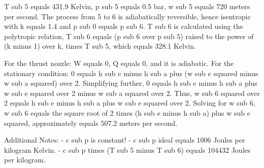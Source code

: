 T sub 5 equals 431.9 Kelvin, p sub 5 equals 0.5 bar, w sub 5 equals 720 meters per second. The process from 5 to 6 is adiabatically reversible, hence isentropic with k equals 1.4 and p sub 0 equals p sub 6. T sub 6 is calculated using the polytropic relation, T sub 6 equals (p sub 6 over p sub 5) raised to the power of (k minus 1) over k, times T sub 5, which equals 328.1 Kelvin.

For the thrust nozzle: W equals 0, Q equals 0, and it is adiabatic. For the stationary condition: 0 equals h sub e minus h sub a plus (w sub e squared minus w sub a squared) over 2. Simplifying further, 0 equals h sub e minus h sub a plus w sub e squared over 2 minus w sub a squared over 2. Thus, w sub 6 squared over 2 equals h sub e minus h sub a plus w sub e squared over 2. Solving for w sub 6, w sub 6 equals the square root of 2 times (h sub e minus h sub a) plus w sub e squared, approximately equals 507.2 meters per second.

Additional Notes:
- c sub p is constant!
- c sub p ideal equals 1006 Joules per kilogram Kelvin.
- c sub p times (T sub 5 minus T sub 6) equals 104432 Joules per kilogram.